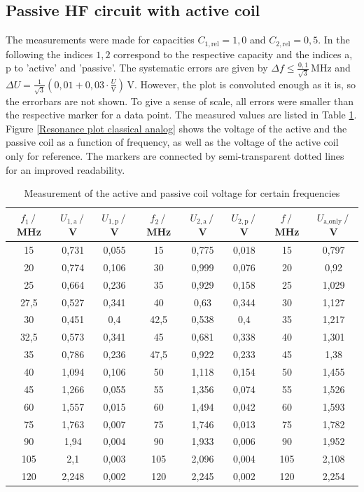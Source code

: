 \documentclass[a4paper,12pt]{article}
\newcommand{\kla}{}
\newcommand{\tecxt}{}
\begin{document}
\subsection{Passive HF circuit with active coil}
The measurements were made for capacities $C_{1,\tecxt\text{rel}}=1,0$ and $C_{2,\tecxt\text{rel}}=0,5$. In the following the indices $1,2$ correspond to the respective capacity and the indices a,\,p to 'active' and 'passive'. The systematic errors are given by $\Delta f\le \frac{0,1}{\sqrt{3}}\,$MHz and $\Delta U=\frac{1}{\sqrt{3}}\kla\left( {0,01+0,03\cdot \frac{U}{\tecxt\text{V}}} \right)\,$V. However, the plot is convoluted enough as it is, so the errorbars are not shown. To give a sense of scale, all errors were smaller than the respective marker for a data point. The measured values are listed in Table \ref{coil voltages for f}. Figure \ref{Resonance plot classical analog} shows the voltage of the active and the passive coil as a function of frequency, as well as the voltage of the active coil only for reference. The markers are connected by semi-transparent dotted lines for an improved readability.
\begin{table}[h!]
\centering
\begin{tabular}{c|c|c||c|c|c||c|c}
$f_1\,/\,$MHz&$U_{1,\tecxt\text{a}}\,/\,$V&$U_{1,\tecxt\text{p}}\,/\,$V&$f_2\,/\,$MHz&$U_{2,\tecxt\text{a}}\,/\,$V&$U_{2,\tecxt\text{p}}\,/\,$V&$f\,/\,$MHz&$U_{\tecxt\text{a},\tecxt\text{only}}\,/\,$V\\ \hline
15	&    0,731&0,055&15&	0,775&	0,018&		    15&	0,797\\ \hline
20	&    0,774&0,106&30&	0,999&	0,076&		    20&	0,92\\ \hline
25	&    0,664&0,236&35&	0,929&	0,158&		    25&	1,029\\ \hline
27,5&    0,527&0,341&40&	0,63&	0,344&		    30&	1,127\\ \hline
30	&    0,451&0,4  &42,5&	0,538&	0,4	&	        35&	1,217\\ \hline
32,5&    0,573&0,341&45&	0,681&	0,338&		    40&	1,301\\ \hline
35	&    0,786&0,236&47,5&	0,922&	0,233&		    45&	1,38\\ \hline
40	&    1,094&0,106&50&	1,118&	0,154&		    50&	1,455\\ \hline
45	&    1,266&0,055&55&	1,356&	0,074&		    55&	1,526\\ \hline
60	&    1,557&0,015&60&	1,494&	0,042&		    60&	1,593\\ \hline
75	&    1,763&0,007&75&	1,746&	0,013&		    75&	1,782\\ \hline
90	&    1,94 &0,004&90&	1,933&	0,006&		    90&	1,952\\ \hline
105	&    2,1  &0,003&105&	2,096&	0,004&		    105&2,108\\ \hline
120	&    2,248&0,002&120&	2,245&	0,002&		    120&2,254
\end{tabular}
\caption{Measurement of the active and passive coil voltage for certain frequencies}
\label{coil voltages for f}
\end{table}
\end{document}
